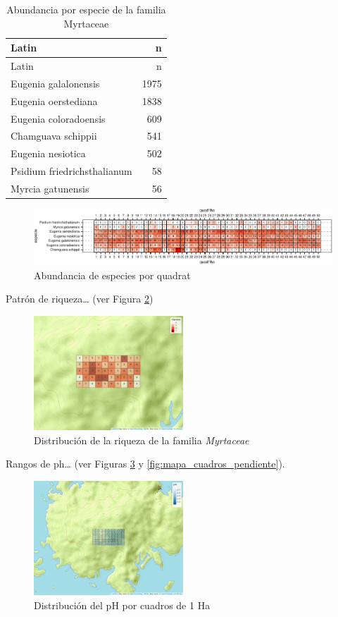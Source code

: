 \documentclass[11pt,]{article}
\begin{document}
\begin{longtable}[]{@{}lr@{}}
\caption{\label{tab:abun_sp}Abundancia por especie de la familia
Myrtaceae}\tabularnewline
\toprule
Latin & n\tabularnewline
\midrule
\endfirsthead
\toprule
Latin & n\tabularnewline
\midrule
\endhead
Eugenia galalonensis & 1975\tabularnewline
Eugenia oerstediana & 1838\tabularnewline
Eugenia coloradoensis & 609\tabularnewline
Chamguava schippii & 541\tabularnewline
Eugenia nesiotica & 502\tabularnewline
Psidium friedrichsthalianum & 58\tabularnewline
Myrcia gatunensis & 56\tabularnewline
\bottomrule
\end{longtable}

\begin{figure}
\centering
\includegraphics{manuscrito_files/figure-latex/unnamed-chunk-3-1.pdf}
\caption{\label{fig:abun_sp_q}Abundancia de especies por quadrat}
\end{figure}

Patrón de riqueza\ldots{} (ver Figura
\ref{fig:mapa_cuadros_riq_mi_familia})

\begin{figure}
\centering
\includegraphics[width=0.50000\textwidth]{mapa_cuadros_riq_mi_familia.png}
\caption{Distribución de la riqueza de la familia \emph{Myrtaceae}
\label{fig:mapa_cuadros_riq_mi_familia}}
\end{figure}

Rangos de ph\ldots{} (ver Figuras \ref{fig:mapa_cuadros_ph} y
\ref{fig:mapa_cuadros_pendiente}).

\begin{figure}
\centering
\includegraphics[width=0.50000\textwidth]{mapa_cuadros_ph.png}
\caption{Distribución del pH por cuadros de 1 Ha
\label{fig:mapa_cuadros_ph}}
\end{figure}
\end{document}
